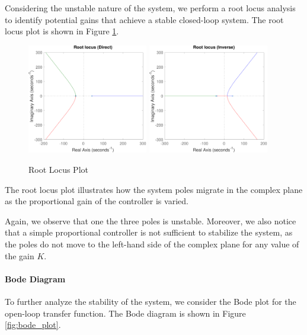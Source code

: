 Considering the unstable nature of the system, we perform a root locus analysis to identify potential gains that achieve a stable closed-loop system.
The root locus plot is shown in Figure \ref{fig:root_locus_plot}.

\begin{figure}[H]
    \centering
    \includegraphics[width=0.47\textwidth]{./img/MATLAB/analysis/root_locus_direct.pdf}
    \hfill
    \includegraphics[width=0.47\textwidth]{./img/MATLAB/analysis/root_locus_inverse.pdf}
    \caption{Root Locus Plot}
    \label{fig:root_locus_plot}
\end{figure}

The root locus plot illustrates how the system poles migrate in the complex plane as the proportional gain of the controller is varied.

Again, we observe that one the three poles is unstable.
Moreover, we also notice that a simple proportional controller is not sufficient to stabilize the system, as the poles do not move to the left-hand side of the complex plane for any value of the gain $K$.



\paragraph{Bode Diagram}

To further analyze the stability of the system, we consider the Bode plot for the open-loop transfer function.
The Bode diagram is shown in Figure \ref{fig:bode_plot}.

